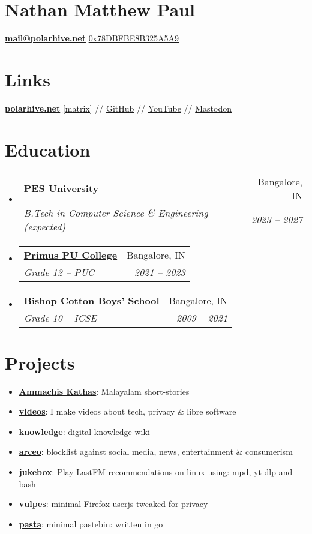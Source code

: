 \documentclass[letterpaper, 11pt]{article}
\makeatletter
\newcommand{\resumeItem}[2]{
  \item\small{
    \textbf{#1}{: #2 \vspace{-2pt}}
  }
}
\newcommand{\resumeSubheading}[4]{
 \vspace{-1pt}\item
 \begin{tabular*}{0.97\textwidth}[t]{l@{\extracolsep{\fill}}r}
   \textbf{#1} & #2 \\
  \textit{\small#3} & \textit{\small #4} \\
 \end{tabular*}\vspace{-5pt}
}
\newcommand{\resumeSubItem}[2]{\resumeItem{#1}{#2}\vspace{-4pt}}
\newcommand{\resumeSubHeadingListStart}{\begin{itemize}[leftmargin=*]}
\newcommand{\resumeSubHeadingListEnd}{\end{itemize}}
\makeatother
\begin{document}
\section{\Huge {\textbf {Nathan Matthew Paul}}}
{\textbf{\href{mailto:mail@polarhive.net}{mail@polarhive.net}}}
\newline
{\href{https://polarhive.net/.well-known/polarhive_gpg.txt}{0x78DBFBE8B325A5A9}}

\section{Links}
{\textbf{\href{https://polarhive.net}{polarhive.net}}
\newline
{\href{https://matrix.to/#/@polarhive:matrix.org}{[matrix]}} //
{\href{https://github.com/polarhive}{GitHub}} //
{\href{https://youtube.com/polarhive}{YouTube}} //
{\href{https://mastodon.social/@polarhive}{Mastodon}}

\section{Education}
  \resumeSubHeadingListStart
    \resumeSubheading
      {\href{https://pes.edu}{PES University}}{Bangalore, IN}
      {B.Tech in Computer Science \& Engineering (expected)} {2023 -- 2027}
    \resumeSubheading
      {\href{https://primuspucollege.edu.in}{Primus PU College}}{Bangalore, IN}
      {Grade 12 -- PUC}{2021 -- 2023}
    \resumeSubheading
      {\href{https://en.wikipedia.org/wiki/Bishop_Cotton_Boys'_School}{Bishop Cotton Boys' School}}{Bangalore, IN}
      {Grade 10 -- ICSE}{2009 -- 2021}
\resumeSubHeadingListEnd

\section{Projects}
  \resumeSubHeadingListStart
    \resumeSubItem{\href{https://polarhive.net/ammachiskathas}{Ammachis Kathas}}
      {Malayalam short-stories}
    \resumeSubItem{\href{https://polarhive.net/videos}{videos}}
      {I make videos about tech, privacy \& libre software}
    \resumeSubItem{\href{https://polarhive.net/knowledge}{knowledge}}
      {digital knowledge wiki}
    \resumeSubItem{\href{https://polarhive.net/arceo}{arceo}}
      {blocklist against social media, news, entertainment \& consumerism}
    \resumeSubItem{\href{https://polarhive.net/jukebox}{jukebox}}
      {Play LastFM recommendations on linux using: mpd, yt-dlp and bash}
    \resumeSubItem{\href{https://polarhive.net/vulpes}{vulpes}}
      {minimal Firefox userjs tweaked for privacy}
    \resumeSubItem{\href{https://polarhive.net/pasta}{pasta}}
      {minimal pastebin: written in go}
  \resumeSubHeadingListEnd

}
\end{document}
